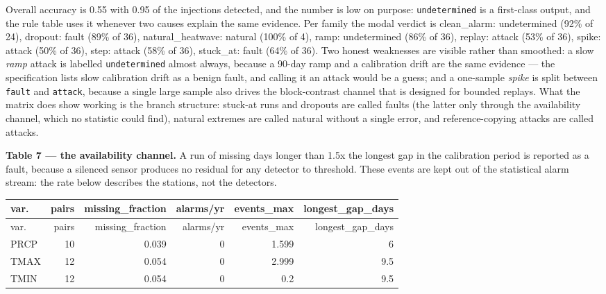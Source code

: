 \documentclass[10pt,a4paper]{article}
\begin{document}
Overall accuracy is 0.55 with 0.95 of the injections detected, and the number is low on purpose: \texttt{undetermined} is a first-\allowbreak{}class output, and the rule table uses it whenever two causes explain the same evidence. Per family the modal verdict is clean\_\allowbreak{}alarm: undetermined (92\% of 24), dropout: fault (89\% of 36), natural\_\allowbreak{}heatwave: natural (100\% of 4), ramp: undetermined (86\% of 36), replay: attack (53\% of 36), spike: attack (50\% of 36), step: attack (58\% of 36), stuck\_\allowbreak{}at: fault (64\% of 36). Two honest weaknesses are visible rather than smoothed: a slow \emph{ramp} attack is labelled \texttt{undetermined} almost always, because a 90-\allowbreak{}day ramp and a calibration drift are the same evidence — the specification lists slow calibration drift as a benign fault, and calling it an attack would be a guess; and a one-\allowbreak{}sample \emph{spike} is split between \texttt{fault} and \texttt{attack}, because a single large sample also drives the block-\allowbreak{}contrast channel that is designed for bounded replays. What the matrix does show working is the branch structure: stuck-\allowbreak{}at runs and dropouts are called faults (the latter only through the availability channel, which no statistic could find), natural extremes are called natural without a single error, and reference-\allowbreak{}copying attacks are called attacks.

\textbf{Table 7 — the availability channel.} A run of missing days longer than 1.5x the longest gap in the calibration period is reported as a fault, because a silenced sensor produces no residual for any detector to threshold. These events are kept out of the statistical alarm stream: the rate below describes the stations, not the detectors.

{\small
\setlength{\tabcolsep}{4.5pt}
\setlength{\LTleft}{\fill}
\setlength{\LTright}{\fill}
\begin{longtable}{lrrrrr}
\toprule
var. & pairs & missing\_\allowbreak{}fraction & alarms/\allowbreak{}yr & events\_\allowbreak{}max & longest\_\allowbreak{}gap\_\allowbreak{}days \\
\midrule
\endfirsthead
\toprule
var. & pairs & missing\_\allowbreak{}fraction & alarms/\allowbreak{}yr & events\_\allowbreak{}max & longest\_\allowbreak{}gap\_\allowbreak{}days \\
\midrule
\endhead
\bottomrule
\endlastfoot
PRCP & 10 & 0.039 & 0 & 1.599 & 6 \\
TMAX & 12 & 0.054 & 0 & 2.999 & 9.5 \\
TMIN & 12 & 0.054 & 0 & 0.2 & 9.5 \\
\end{longtable}
}
\end{document}
